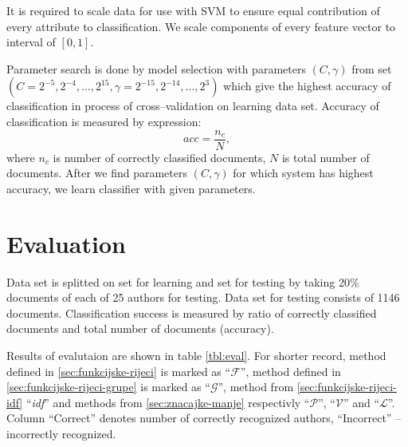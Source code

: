 \documentclass[11pt,english]{article}
\begin{document}
\begin{multicols}{2}
It is required to scale data for use with SVM to ensure equal contribution of
every attribute to classification. We scale components of every feature vector
to interval of $[0, 1]$.

Parameter search is done by model selection with parameters $(C, \gamma)$ from
set $\left (C = {2^{-5}, 2^{-4}, \ldots , 2^{15}},  \gamma = {2^{-15}, 2^{-14},
\ldots, 2^3} \right )$ \citep{CC01a} which give the highest accuracy of
classification in process of cross--validation on learning data set. Accuracy
of classification is measured by expression:
\begin{equation}
acc = \frac{n_c}{N}, %
\end{equation}
where $n_c$ is number of correctly classified documents, $N$ is total number of
documents. After we find parameters $(C, \gamma)$ for which system has highest
accuracy, we learn classifier with given parameters.


\section{Evaluation}
\label{sec:evaluacija}
Data set is splitted on set for learning and set for testing by taking 20\%
documents of each of 25 authors for testing. Data set for testing consists of
1146 documents. Classification success is measured by ratio of correctly
classified documents and total number of documents (accuracy).

Results of evalutaion are shown in table \ref{tbl:eval}. For shorter record,
method defined in \ref{sec:funkcijske-rijeci} is marked as ``$\mathcal{F}$'', method
defined in \ref{sec:funkcijske-rijeci-grupe} is marked as ``$\mathcal{G}$'',
method from \ref{sec:funkcijske-rijeci-idf} ``\emph{idf}'' and methods from
\ref{sec:znacajke-manje} respectivly ``$\mathcal{P}$'', ``$\mathcal{V}$'' and
``$\mathcal{L}$''. Column ``Correct'' denotes number of correctly
recognized authors, ``Incorrect'' -- incorrectly recognized.


\end{multicols}
\end{document}
